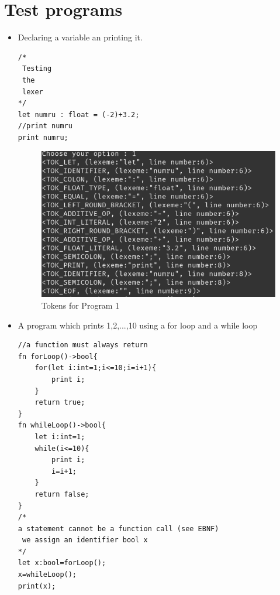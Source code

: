 \section{Test programs}
\begin{itemize}
    \item Declaring a variable an printing it.
\begin{lstlisting}[basicstyle=\tiny,caption=Program 1]
/*
 Testing
 the
 lexer
*/
let numru : float = (-2)+3.2;
//print numru
print numru;
\end{lstlisting}
\begin{figure}[H]
    \centering
    \includegraphics[scale=0.50]{Task1/output/tokenOutput1.png}
    \caption{Tokens for Program 1}
    \label{fig:tokens for program 1}
\end{figure}
    \item A program which prints 1,2,...,10 using a for loop and a while loop
\begin{lstlisting}[basicstyle=\tiny,caption=Program 2]
//a function must always return
fn forLoop()->bool{
	for(let i:int=1;i<=10;i=i+1){
		print i;
	}
	return true;
}
fn whileLoop()->bool{
	let i:int=1;
	while(i<=10){
		print i;
		i=i+1;
	}
	return false;
}
/*
a statement cannot be a function call (see EBNF)
 we assign an identifier bool x
*/
let x:bool=forLoop();
x=whileLoop();
print(x);
\end{lstlisting}
\begin{figure}[H]
    \centering

\end{figure}
\end{itemize}
